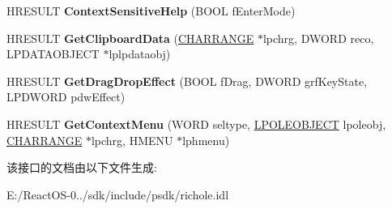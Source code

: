 \begin{DoxyCompactItemize}
H\+R\+E\+S\+U\+LT {\bfseries Context\+Sensitive\+Help} (B\+O\+OL f\+Enter\+Mode)
\item 
\mbox{\label{interface_i_rich_edit_ole_callback_a73882d22033dba9ff73d7b738c08b9c3}} 
H\+R\+E\+S\+U\+LT {\bfseries Get\+Clipboard\+Data} (\hyperlink{struct__charrange}{C\+H\+A\+R\+R\+A\+N\+GE} $\ast$lpchrg, D\+W\+O\+RD reco, L\+P\+D\+A\+T\+A\+O\+B\+J\+E\+CT $\ast$lplpdataobj)
\item 
\mbox{\label{interface_i_rich_edit_ole_callback_addfc058bcc7833dda3bde329e1b06b6a}} 
H\+R\+E\+S\+U\+LT {\bfseries Get\+Drag\+Drop\+Effect} (B\+O\+OL f\+Drag, D\+W\+O\+RD grf\+Key\+State, L\+P\+D\+W\+O\+RD pdw\+Effect)
\item 
\mbox{\label{interface_i_rich_edit_ole_callback_a62bd8d3ca9d71bb244d396ac7f3d7a8d}} 
H\+R\+E\+S\+U\+LT {\bfseries Get\+Context\+Menu} (W\+O\+RD seltype, \hyperlink{struct___o_l_e_o_b_j_e_c_t}{L\+P\+O\+L\+E\+O\+B\+J\+E\+CT} lpoleobj, \hyperlink{struct__charrange}{C\+H\+A\+R\+R\+A\+N\+GE} $\ast$lpchrg, H\+M\+E\+NU $\ast$lphmenu)
\end{DoxyCompactItemize}


该接口的文档由以下文件生成\+:\begin{DoxyCompactItemize}
\item 
E\+:/\+React\+O\+S-\/0../sdk/include/psdk/richole.\+idl\end{DoxyCompactItemize}
